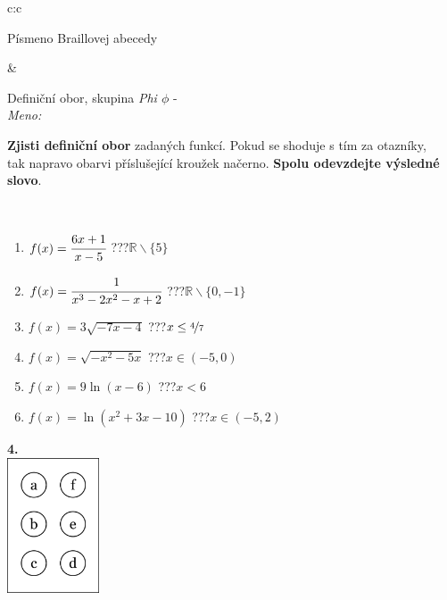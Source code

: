 \documentclass[10pt]{report}
\begin{document}
\begin{tabular}{c:c}
\begin{minipage}[c][104.5mm][t]{0.5\linewidth}
\begin{center}
\begin{minipage}{0.20\linewidth}
\begin{center}
{\small Písmeno Braillovej abecedy}
\end{center}
\end{minipage}
\end{center}
\end{minipage}
&
\begin{minipage}[c][104.5mm][t]{0.5\linewidth}
\begin{center}
\vspace{7mm}
{\huge Definiční obor, skupina \textit{Phi $\phi$} -}\\[5mm]
\textit{Meno:}\phantom{xxxxxxxxxxxxxxxxxxxxxxxxxxxxxxxxxxxxxxxxxxxxxxxxxxxxxxxxxxxxxxxxx}\\[5mm]
\begin{minipage}{0.95\linewidth}
\textbf{Zjisti definiční obor} zadaných funkcí. Pokud se shoduje s tím za otazníky,\\tak napravo obarvi příslušející kroužek načerno. \textbf{Spolu odevzdejte výsledné slovo}.
\end{minipage}
\\[1mm]
\begin{minipage}{0.79\linewidth}
\begin{center}
\begin{varwidth}{\linewidth}
\begin{enumerate}
\normalsizerrr
\item $f(x)=\cfrac{6x+1}{x-5}$\quad \dotfill\; ???\;\dotfill \quad $\mathbb{R}\smallsetminus\{5\}$
\item $f(x)=\cfrac{1}{x^3-2x^2-x+2}$\quad \dotfill\; ???\;\dotfill \quad $\mathbb{R}\smallsetminus\{0,-1\}$
\item $f(x)=3\sqrt{-7x-4}$\quad \dotfill\; ???\;\dotfill \quad $x\leq\nicefrac{4}{7}$
\item $f(x)=\sqrt{-x^2-5x}$\quad \dotfill\; ???\;\dotfill \quad $x\in(-5 , 0)$
\item $f(x)=9\ln{(x-6)}$\quad \dotfill\; ???\;\dotfill \quad $x<6$
\item $f(x)=\ln{(x^2+3x-10)}$\quad \dotfill\; ???\;\dotfill \quad $x\in(-5 , 2)$
\end{enumerate}
\end{varwidth}
\end{center}
\end{minipage}
\begin{minipage}{0.20\linewidth}
\begin{center}
{\Huge\bfseries 4.} \\[2mm]
\includegraphics[height=40mm]{../images/braille.png}

\end{center}
\end{minipage}
\end{center}
\end{minipage}
\end{tabular}
\end{document}
